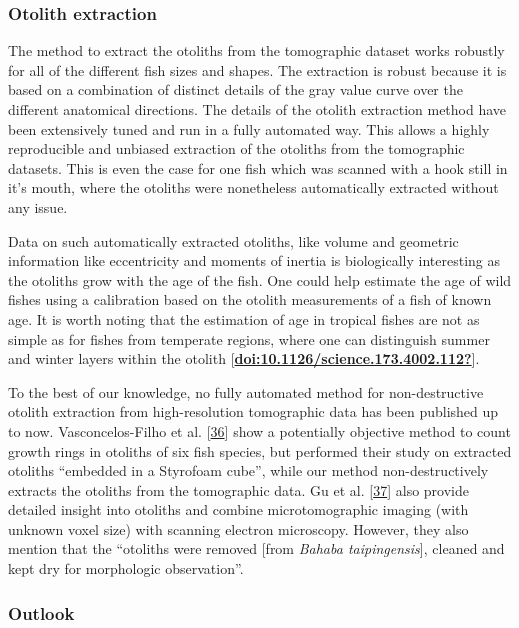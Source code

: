 \hypertarget{otolith-extraction}{%
\subsubsection{Otolith extraction}\label{otolith-extraction}}

The method to extract the otoliths from the tomographic dataset works robustly for all of the different fish sizes and shapes.
The extraction is robust because it is based on a combination of distinct details of the gray value curve over the different anatomical directions.
The details of the otolith extraction method have been extensively tuned and run in a fully automated way.
This allows a highly reproducible and unbiased extraction of the otoliths from the tomographic datasets.
This is even the case for one fish which was scanned with a hook still in it's mouth, where the otoliths were nonetheless automatically extracted without any issue.

Data on such automatically extracted otoliths, like volume and geometric information like eccentricity and moments of inertia is biologically interesting as the otoliths grow with the age of the fish.
One could help estimate the age of wild fishes using a calibration based on the otolith measurements of a fish of known age.
It is worth noting that the estimation of age in tropical fishes are not as simple as for fishes from temperate regions, where one can distinguish summer and winter layers within the otolith {[}\protect\hyperlink{ref-doi:10.1126ux2fscience.173.4002.112}{\textbf{doi:10.1126/science.173.4002.112?}}{]}.

To the best of our knowledge, no fully automated method for non-destructive otolith extraction from high-resolution tomographic data has been published up to now.
Vasconcelos-Filho et al. {[}\protect\hyperlink{ref-PgMc4mCy}{36}{]} show a potentially objective method to count growth rings in otoliths of six fish species, but performed their study on extracted otoliths ``embedded in a Styrofoam cube'', while our method non-destructively extracts the otoliths from the tomographic data.
Gu et al. {[}\protect\hyperlink{ref-HYXdLQTV}{37}{]} also provide detailed insight into otoliths and combine microtomographic imaging (with unknown voxel size) with scanning electron microscopy.
However, they also mention that the ``otoliths were removed {[}from \emph{Bahaba taipingensis}{]}, cleaned and kept dry for morphologic observation''.

\hypertarget{outlook}{%
\subsubsection{Outlook}\label{outlook}}

